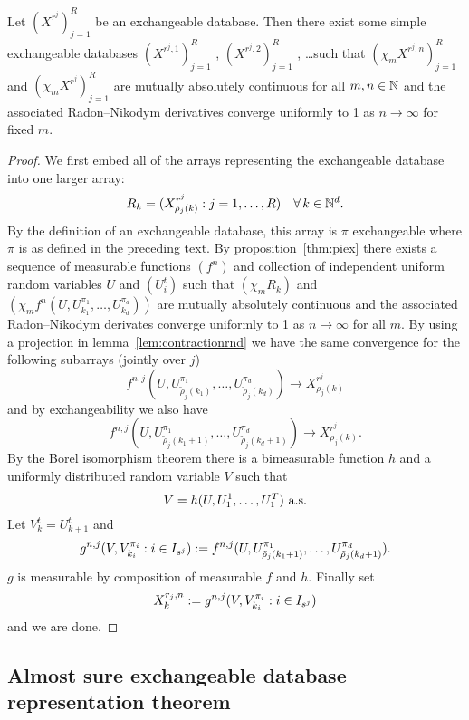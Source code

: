 \begin{thm}
  \label{thm:simple-database}
  Let $(X^{r^j})_{j=1}^R$ be an exchangeable database.
  Then there exist some simple exchangeable databases $(X^{r^j,1})_{j=1}^R$ , $(X^{r^j,2})_{j=1}^R$ , \dots such that
  $(\chi_m X^{r^j,n})_{j=1}^R$ and $(\chi_m X^{r^j})_{j=1}^R$ are mutually absolutely continuous for all $m,n \in \mathbb{N}$ and the associated Radon--Nikodym derivatives converge uniformly to 1 as $n \to \infty$ for fixed $m$.
\end{thm}

\begin{proof}
  We first embed all of the arrays representing the exchangeable database into one larger array:
  \[
    R_{k} = (X^{r^j}_{\rho_j(k)} : j = 1,\dots,R) \quad \forall \, k \in \mathbb{N}^d.
  \]
  By the definition of an exchangeable database, this array is $\pi$ exchangeable where $\pi$ is as defined in the preceding text.
  By proposition~\ref{thm:piex} there exists a sequence of measurable functions $(f^n)$ and collection of independent uniform random variables $U$ and $(U^t_i)$ such that $(\chi_m R_{k})$ and $(\chi_m f^n(U, U^{\pi_1}_{k_1}, \dots, U^{\pi_d}_{k_d}))$ are mutually absolutely continuous and the associated Radon--Nikodym derivates converge uniformly to 1 as $n \to \infty$ for all $m$.
  By using a projection in lemma~\ref{lem:contractionrnd} we have the same convergence for the following subarrays (jointly over $j$)
  \[
    f^{n,j}(U, U^{\pi_1}_{\tilde{\rho}_j(k_1)}, \dots, U^{\pi_d}_{\tilde{\rho}_j(k_d)}) \to X^{r^j}_{\rho_j(k)}
  \]
  and by exchangeability we also have \[
    f^{n,j}(U, U^{\pi_1}_{\tilde{\rho}_j(k_1+1)}, \dots, U^{\pi_d}_{\tilde{\rho}_j(k_d+1)}) \to X^{r^j}_{\rho_j(k)}.
  \]
  By the Borel isomorphism theorem there is a bimeasurable function $h$ and a uniformly distributed random variable $V$ such that
  \[
    V = h(U, U^1_1, \dots, U^T_1) \,\, \textrm{a.s.}
  \]
  Let $V^t_k = U^t_{k+1}$ and
  \[
    g^{n,j}(V, V^{\pi_i}_{k_i} : i \in I_{s^j}) := f^{n,j}(U, U^{\pi_1}_{\tilde{\rho}_j(k_1+1)}, \dots, U^{\pi_d}_{\tilde{\rho}_j(k_d+1)}).
  \]
  $g$ is measurable by composition of measurable $f$ and $h$.
  Finally set
  \[
    X^{r_j,n}_{k} := g^{n,j}(V, V^{\pi_i}_{k_i} : i \in I_{s^j})
  \]
  and we are done.
\end{proof}

\subsection{Almost sure exchangeable database representation theorem}

